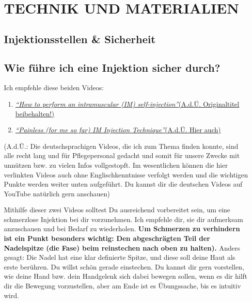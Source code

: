 \documentclass{article}
\begin{document}
{ 

\section{TECHNIK UND MATERIALIEN} \label{ts}

\subsection*{Injektionsstellen \& Sicherheit}

\subsection{Wie führe ich eine Injektion sicher durch?}

Ich empfehle diese beiden Videos:

\begin{enumerate}
  \item \href{https://www.youtube.com/watch?v=cBabaGC2Dok}{\textit{“How to perform an intramuscular (IM) self-injection”}(A.d.Ü. Originaltitel beibehalten!)}
  \item \href{https://www.youtube.com/watch?v=YfNlAZLxLyw}{\textit{“Painless (for me so far) IM Injection Technique”}(A.d.Ü. Hier auch)}
\end{enumerate}
																																																																																																									   

(A.d.Ü.: Die deutschsprachigen Videos, die ich zum Thema finden konnte, sind alle recht lang und für Pflegepersonal gedacht und somit für unsere Zwecke mit unnützen bzw. zu vielen Infos vollgestopft. Im wesentlichen können die hier verlinkten Videos auch ohne Englischkenntnisse verfolgt werden und die wichtigen Punkte werden weiter unten aufgeführt. Du kannst dir die deutschen Videos auf YouTube natürlich gern anschauen) 

Mithilfe dieser zwei Videos solltest Du ausreichend vorbereitet sein, um eine schmerzlose Injektion bei dir vorzunehmen. Ich empfehle dir, sie dir aufmerksam anzuschauen und bei Bedarf zu wiederholen. \textbf{Um Schmerzen zu verhindern ist ein Punkt besonders wichtig: Den abgeschrägten Teil der Nadelspitze (die Fase) beim reinstechen nach oben zu halten).} Anders gesagt: Die Nadel hat eine klar definierte Spitze, und diese soll deine Haut als erste berühren. Du willst schön gerade einstechen. Du kannst dir gern vorstellen, wie deine Hand bzw. dein Handgelenk sich dabei bewegen sollen, wenn es dir hilft dir die Bewegung vorzustellen, aber am Ende ist es Übungssache, bis es intuitiv wird.

}
\end{document}

